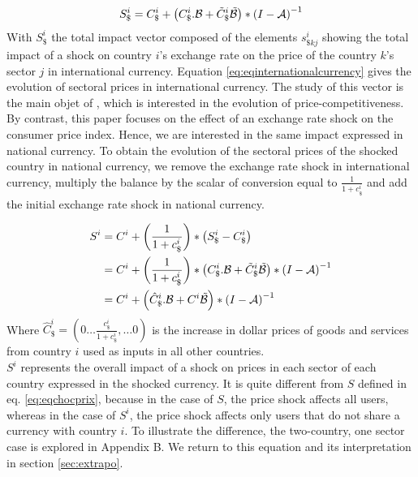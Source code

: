 \documentclass[11pt,a4paper]{article}
\begin{document}
 
 \begin{eqnarray}
S_\$^i=C_\$^i+\left(C_\$^i.{\cal B}+{\tilde{C}_\$^i}{\tilde{{\cal B}}}\right)*{{(I-{\cal A})}^{-1}}	
\label{eq:eqinternationalcurrency}
 \end{eqnarray}
With $S_\$^i$ the total impact vector composed of the elements ${{{s}}^i_{\$kj}}$ showing the total impact of a shock on country $i$'s exchange rate on the price of the country $k$'s sector $j$ in international currency. 
Equation \ref{eq:eqinternationalcurrency} gives the evolution of sectoral prices in international currency. The study of this vector is the main objet of \cite{Cochard2016}, which is interested in the evolution of price-competitiveness.\\
By contrast, this paper focuses on the effect of an exchange rate shock on the consumer price index. Hence, we are interested in the same impact expressed in national currency. To obtain the evolution of the sectoral prices of the shocked country in national currency, we remove the exchange rate shock in international currency, multiply the balance by the scalar of conversion equal to $\frac{1}{1+c_\$^i}$ and add the initial exchange rate shock in national currency.

\begin{equation}
\begin{aligned}
	S^i&=C^i  + \left( \frac{1}{1+{{c}_\$^i}}\right)*\left({S_\$^i}-{{C}_{\$}^i}\right)\\
	&=C^i + \left( \frac{1}{1+{{c}_\$^i}}\right)*\left(C_\$^i.{\cal B}+{\tilde{C}_\$^i}{\tilde{{\cal B}}}\right)*{{(I-{\cal A})}^{-1}} 	\\
	&=C^i	+ \left(\hat{C}^i_\$.{\cal B}+{C^i}{\tilde{{\cal B}}}\right)*{{(I-{\cal A})}^{-1}}	
\label{eq:eqdomcurrency}
\end{aligned}
\end{equation}
Where $\hat{C}^i_\$=\left(0 \ldots \frac{c_\$^i}{1+c_\$^i},\ldots 0 \right)$ is the increase in dollar prices of goods and services from country $i$ used as inputs in all other countries.\\ 
$S^i$ represents the overall impact of a shock on prices in each sector of each country expressed in the shocked currency.
It is quite different from $S$ defined in eq. \eqref{eq:eqchocprix}, because in the case of $S$, the price shock affects all users, whereas in the case of $S^i$, the price shock affects only users that do not share a currency with country $i$. 
To illustrate the difference, the two-country, one sector case is explored in Appendix B. We return to this equation and its interpretation in section  \ref{sec:extrapo}.
\end{document}
